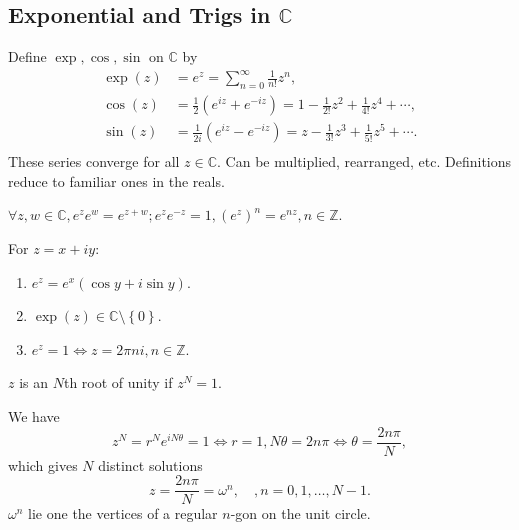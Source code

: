\documentclass[a4paper]{article}
\begin{document}
\subsection{Exponential and Trigs in $\mathbb{C}$}
\begin{definition}
  Define $ \exp, \cos, \sin $ on $ \mathbb{C} $ by
  \[
    \begin{aligned}
      \exp(z)&= e^z = \sum_{n=0}^{\infty} \frac{1}{n!}z^n,\\
      \cos(z)&= \frac{1}{2}(e^{iz}+e^{-iz}) =
      1-\frac{1}{2!}z^2+\frac{1}{4!}z^4+\cdots,\\
      \sin(z)&= \frac{1}{2i}(e^{iz}-e^{-iz}) =
      z-\frac{1}{3!}z^3+\frac{1}{5!}z^5+\cdots.\\
    \end{aligned}
  \]
  These series converge for all $ z\in \mathbb{C} $. Can be
  multiplied, rearranged, etc. Definitions reduce to familiar ones in the reals.
\end{definition}
\begin{proposition}\label{prop:exp multi}
  $ \forall z,w\in \mathbb{C}, e^ze^w=e^{z+w}; e^ze^{-z}=1, (e^z)^n
  =e^{nz}, n\in \mathbb{Z}$.
\end{proposition}
\begin{lemma}\label{lma:exp_arth}
  For $z=x+iy$:
  \begin{enumerate}[(1)]
    \item $ e^z = e^x(\cos y+i\sin y) $.
    \item $ \exp(z)\in \mathbb{C} \setminus \left\{ 0\right\} $.
    \item $ e^z = 1 \Leftrightarrow z = 2\pi n i, n\in \mathbb{Z} $.
  \end{enumerate}
\end{lemma}
\begin{definition}
  $z$ is an $ N $th root of unity if $ z^N=1 $.
\end{definition}
We have
\[
  z^N=r^Ne^{iN\theta} =1 \Longleftrightarrow r=1, N\theta = 2n\pi
  \Longleftrightarrow \theta = \frac{2n\pi}{N}
,\]
which gives $N$ distinct solutions
\[
  z = \frac{2n\pi}{N} = \omega^n, \quad, n=0,1,\dots, N-1
.\]
$\omega^n$ lie one the vertices of a regular $n$-gon on the unit circle.
\end{document}
